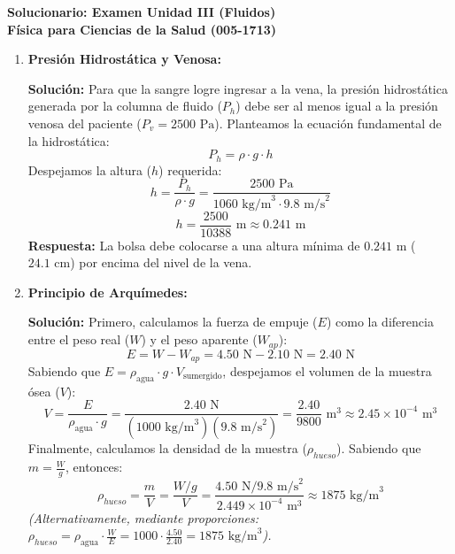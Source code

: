 \documentclass[12pt,letterpaper]{article}
\begin{document}
\begin{center}
    \textbf{\Large Solucionario: Examen Unidad III (Fluidos)}\\
    \vspace{0.2cm}
    \textbf{Física para Ciencias de la Salud (005-1713)}\\
\end{center}

\vspace{0.5cm}

\begin{enumerate}

    \item \textbf{Presión Hidrostática y Venosa:}
    
    \textbf{Solución:}
    Para que la sangre logre ingresar a la vena, la presión hidrostática generada por la columna de fluido ($P_h$) debe ser al menos igual a la presión venosa del paciente ($P_v = 2500 \text{ Pa}$).
    Planteamos la ecuación fundamental de la hidrostática:
    \[
    P_h = \rho \cdot g \cdot h
    \]
    Despejamos la altura ($h$) requerida:
    \[
    h = \frac{P_h}{\rho \cdot g} = \frac{2500 \text{ Pa}}{1060 \text{ kg/m}^3 \cdot 9.8 \text{ m/s}^2}
    \]
    \[
    h = \frac{2500}{10388} \text{ m} \approx 0.241 \text{ m}
    \]
    \textbf{Respuesta:} La bolsa debe colocarse a una altura mínima de $0.241 \text{ m}$ ($24.1 \text{ cm}$) por encima del nivel de la vena.

    \vspace{0.5cm}
    \item \textbf{Principio de Arquímedes:}
    
    \textbf{Solución:}
    Primero, calculamos la fuerza de empuje ($E$) como la diferencia entre el peso real ($W$) y el peso aparente ($W_{ap}$):
    \[
    E = W - W_{ap} = 4.50 \text{ N} - 2.10 \text{ N} = 2.40 \text{ N}
    \]
    Sabiendo que $E = \rho_{\text{agua}} \cdot g \cdot V_{\text{sumergido}}$, despejamos el volumen de la muestra ósea ($V$):
    \[
    V = \frac{E}{\rho_{\text{agua}} \cdot g} = \frac{2.40 \text{ N}}{(1000 \text{ kg/m}^3)(9.8 \text{ m/s}^2)} = \frac{2.40}{9800} \text{ m}^3 \approx 2.45 \times 10^{-4} \text{ m}^3
    \]
    Finalmente, calculamos la densidad de la muestra ($\rho_{hueso}$). Sabiendo que $m = \frac{W}{g}$, entonces:
    \[
    \rho_{hueso} = \frac{m}{V} = \frac{W/g}{V} = \frac{4.50 \text{ N} / 9.8 \text{ m/s}^2}{2.449 \times 10^{-4} \text{ m}^3} \approx 1875 \text{ kg/m}^3
    \]
    \textit{(Alternativamente, mediante proporciones: $\rho_{hueso} = \rho_{\text{agua}} \cdot \frac{W}{E} = 1000 \cdot \frac{4.50}{2.40} = 1875 \text{ kg/m}^3$).}
    

\end{enumerate}
\end{document}
